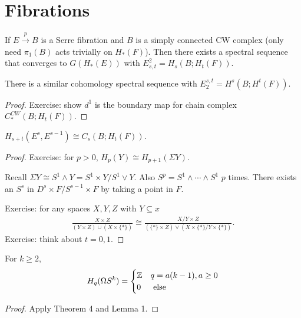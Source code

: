 \documentclass[12pt,class=article,crop=false]{standalone}
\begin{document}
\section{Fibrations}
\begin{thm}
If $ E \xrightarrow{ p} B $ is a Serre fibration and $ B$ is a simply connected CW complex (only need $ \pi_1(B)$ acts trivially on $ H_*(F)$). Then there exists a spectral sequence that converges to $ G(H_*(E))$ with  $ E_{s,t}^2 = H_s(B;H_t(F))$.
\end{thm}
\begin{remark}
There is a similar cohomology spectral sequence with $ E_2^{s,t} = H^{s}(B;H^{t}(F))$.
\end{remark}
\begin{proof}
Exercise: show $ d^{1}$ is the boundary map for chain complex $ C_*^{CW}(B; H_t(F))$.
\end{proof}
\begin{lem}
$H_{s+t}(E^{s} , E^{s-1}) \cong C_s(B;H_t(F))$.
\end{lem}
\begin{proof}
Exercise: for $ p>0$,  $ H_p(Y)  \cong H_{p+1}(\Sigma Y)$. 

Recall $ \Sigma Y \cong S^{1} \wedge Y = S^{1} \times Y / S^{1} \vee Y$. Also $ S^{p} = S^{1} \wedge \cdots \wedge S^{1}$ $ p$ times. There exists an $ S^{s}$  in $ D^{s} \times F /S^{s-1} \times F$ by taking a point in $ F$.

Exercise: for any spaces  $ X,Y,Z$ with  $ Y \subseteq x$
\begin{align*}
	\frac{X\times Z}{ (Y \times Z) \cup (X \times \{*\} )} \cong \frac{X /Y \times Z}{(\{*\} \times Z ) \vee (X \times \{*\} / Y \times \{*\} ) }.
\end{align*}
Exercise: think about $ t=0,1$.


\end{proof}
\begin{thm}
For $ k \geq 2$,
\begin{align*}
	H_q(\Omega S^{k}) = \begin{cases}
		\mathbb{Z}& q = a(k-1) , a \geq 0\\
		0& \text{ else}\\ 
	\end{cases}
\end{align*}
\end{thm}
\begin{proof}
Apply Theorem 4 and Lemma 1.
\end{proof}
\end{document}
